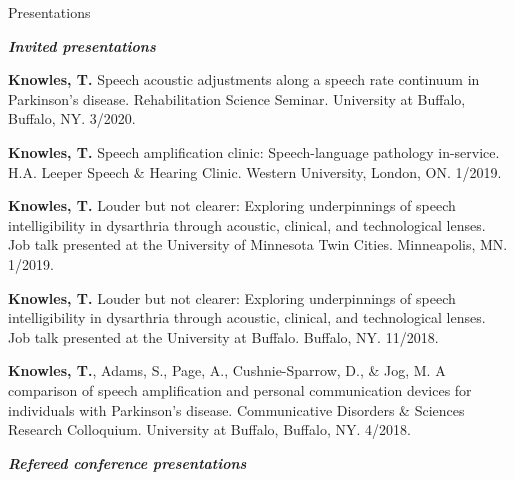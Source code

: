 \documentclass{resume} %
\begin{document}


\begin{rSection}{Presentations}

\begin{center}
	{\bf \emph{Invited presentations}}
\end{center}

{\bf Knowles, T.} Speech acoustic adjustments along a speech rate continuum in Parkinson's disease. Rehabilitation Science Seminar. University at Buffalo, Buffalo, NY. 3/2020.

{\bf Knowles, T.} Speech amplification clinic: Speech-language pathology in-service. H.A. Leeper Speech \& Hearing Clinic. Western University, London, ON. 1/2019.

{\bf Knowles, T.} Louder but not clearer: Exploring underpinnings of speech intelligibility in dysarthria through acoustic, clinical, and technological lenses. Job talk presented at the University of Minnesota Twin Cities. Minneapolis, MN. 1/2019.

{\bf Knowles, T.} Louder but not clearer: Exploring underpinnings of speech intelligibility in dysarthria through acoustic, clinical, and technological lenses. Job talk presented at the University at Buffalo. Buffalo, NY. 11/2018.

{\bf Knowles, T.}, Adams, S., Page, A., Cushnie-Sparrow, D., \& Jog, M. A comparison of speech amplification and personal communication devices for individuals with Parkinson's disease. Communicative Disorders \& Sciences Research Colloquium. University at Buffalo, Buffalo, NY. 4/2018.



\begin{center}
	{\bf \emph{Refereed conference presentations}}
\end{center}



\end{rSection}
\end{document}
